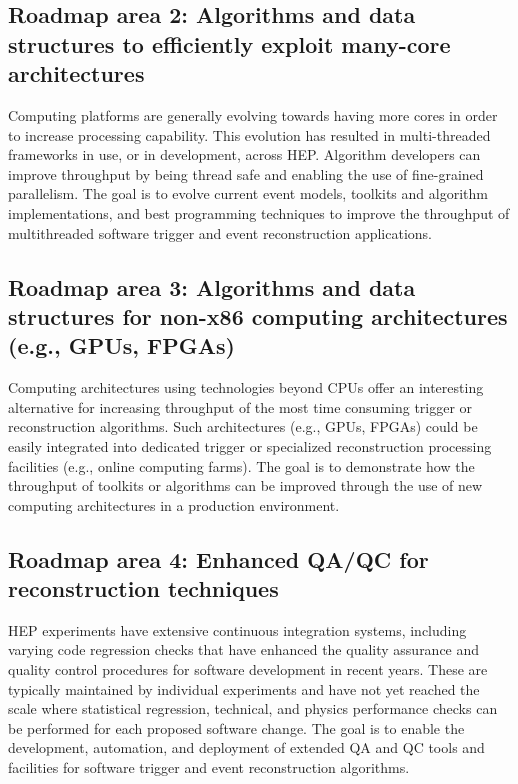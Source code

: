 \subsection*{Roadmap area 2: Algorithms and data structures to efficiently exploit many-core architectures}
  
Computing platforms are generally evolving towards having more cores in order to increase processing capability. This evolution has resulted in multi-threaded frameworks in use, or in development, across HEP. Algorithm developers can improve throughput by being thread safe and enabling the use of fine-grained parallelism. The goal is to evolve current event models, toolkits and algorithm implementations, and best programming techniques to improve the throughput of multithreaded software trigger and event reconstruction applications.

\subsection*{Roadmap area 3: Algorithms and data structures for non-x86 computing architectures (e.g., GPUs, FPGAs)}

Computing architectures using technologies beyond CPUs offer an interesting alternative for increasing throughput of the most time consuming trigger or reconstruction algorithms. Such architectures (e.g., GPUs, FPGAs) could be easily integrated into dedicated trigger or specialized reconstruction processing facilities (e.g., online computing farms). The goal is to demonstrate how the throughput of toolkits or algorithms can be improved through the use of new computing architectures in a production environment. 

\subsection*{Roadmap area 4: Enhanced QA/QC for reconstruction techniques}

HEP experiments have extensive continuous integration systems, including varying code regression checks that have enhanced the quality assurance and quality control procedures for software development in recent years. These are typically maintained by individual experiments and have not yet reached the scale where statistical regression, technical, and physics performance checks can be performed for each proposed software change. The goal is to enable the development, automation, and deployment of extended QA and QC tools and facilities for software trigger and event reconstruction algorithms. 

